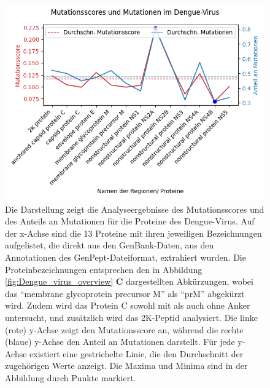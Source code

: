 \documentclass[german,version-2022-01]{uzl-thesis}
\begin{document}
\begin{figure}[tbp]
  \centering
  \includegraphics[scale=0.65]{Images/Diagramm_Scores_und_Mutationen_Dengue_viren_Namen.png}
  \caption{Die Darstellung zeigt die Analyseergebnisse des Mutationsscores und des Anteils an Mutationen f\"ur die Proteine des Dengue-Virus. Auf der x-Achse sind die 13 Proteine mit ihren jeweiligen Bezeichnungen aufgelistet, die direkt aus den GenBank-Daten, aus den Annotationen des GenPept-Dateiformat, extrahiert wurden. Die Proteinbezeichnungen entsprechen den in Abbildung \ref{fig:Dengue_virus_overview} \textbf{C} dargestellten Abk\"urzungen, wobei das "`membrane glycoprotein precursor M"' als "`prM"' abgek\"urzt wird. Zudem wird das Protein C sowohl mit als auch ohne Anker untersucht, und zus\"atzlich wird das 2K-Peptid analysiert. Die linke (rote) y-Achse zeigt den Mutationsscore an, w\"ahrend die rechte (blaue) y-Achse den Anteil an Mutationen darstellt. F\"ur jede y-Achse existiert eine gestrichelte Linie, die den Durchschnitt der zugeh\"origen Werte anzeigt. Die Maxima und Minima sind in der Abbildung durch Punkte markiert.}
  \label{fig:Dengue_virus_scores_and_mutations_namen}
\end{figure}
\end{document}
